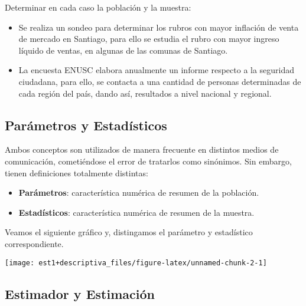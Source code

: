 \documentclass[
]{book}
\providecommand{\tightlist}{%
  \setlength{\itemsep}{0pt}\setlength{\parskip}{0pt}}
\theoremstyle{definition}
\theoremstyle{definition}
\theoremstyle{definition}
\theoremstyle{definition}
\theoremstyle{remark}
\begin{document}
Determinar en cada caso la población y la muestra:

\begin{itemize}
\tightlist
\item
  Se realiza un sondeo para determinar los rubros con mayor inflación de venta de mercado en Santiago, para ello se estudia el rubro con mayor ingreso líquido de ventas, en algunas de las comunas de Santiago.
\item
  La encuesta ENUSC elabora anualmente un informe respecto a la seguridad ciudadana, para ello, se contacta a una cantidad de personas determinadas de cada región del país, dando así, resultados a nivel nacional y regional.
\end{itemize}

\hypertarget{paruxe1metros-y-estaduxedsticos}{%
\subsection*{Parámetros y Estadísticos}\label{paruxe1metros-y-estaduxedsticos}}

Ambos conceptos son utilizados de manera frecuente en distintos medios de comunicación, cometiéndose el error de tratarlos como sinónimos. Sin embargo, tienen definiciones totalmente distintas:

\begin{itemize}
\tightlist
\item
  \textbf{Parámetros}: característica numérica de resumen de la población.
\item
  \textbf{Estadísticos}: característica numérica de resumen de la muestra.
\end{itemize}

Veamos el siguiente gráfico y, distingamos el parámetro y estadístico correspondiente.

\begin{center}\texttt{[image: est1+descriptiva\_files/figure-latex/unnamed-chunk-2-1]} \end{center}

\hypertarget{estimador-y-estimaciuxf3n}{%
\subsection{Estimador y Estimación}\label{estimador-y-estimaciuxf3n}}
\end{document}
